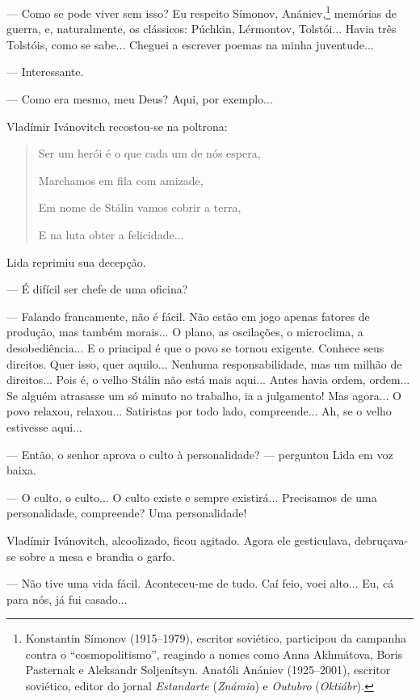 --- Como se pode viver sem isso? Eu respeito Símonov, Anániev,\footnote{Konstantin
  Símonov (1915--1979), escritor soviético, participou da campanha
  contra o ``cosmopolitismo'', reagindo a nomes como Anna Akhmátova,
  Boris Pasternak e Aleksandr Soljenítsyn. Anatóli Anániev (1925--2001),
  escritor soviético, editor do jornal \emph{Estandarte} (\emph{Známia})
  e \emph{Outubro} (\emph{Oktiábr})\emph{.}} memórias de guerra, e,
naturalmente, os clássicos: Púchkin, Lérmontov, Tolstói... Havia três
Tolstóis, como se sabe... Cheguei a escrever poemas na minha
juventude...

--- Interessante.

--- Como era mesmo, meu Deus? Aqui, por exemplo...

Vladímir Ivánovitch recostou-se na poltrona:

\begin{quote}
Ser um herói é o que cada um de nós espera,

Marchamos em fila com amizade,

Em nome de Stálin vamos cobrir a terra,

E na luta obter a felicidade...
\end{quote}

Lida reprimiu sua decepção.

--- É difícil ser chefe de uma oficina?

--- Falando francamente, não é fácil. Não estão em jogo apenas fatores
de produção, mas também morais... O plano, as oscilações, o microclima,
a desobediência... E o principal é que o povo se tornou exigente.
Conhece seus direitos. Quer isso, quer aquilo... Nenhuma
responsabilidade, mas um milhão de direitos... Pois é, o velho Stálin
não está mais aqui... Antes havia ordem, ordem... Se alguém atrasasse um
só minuto no trabalho, ia a julgamento! Mas agora... O povo relaxou,
relaxou... Satiristas por todo lado, compreende... Ah, se o velho
estivesse aqui...

--- Então, o senhor aprova o culto à personalidade? --- perguntou Lida
em voz baixa.

--- O culto, o culto... O culto existe e sempre existirá... Precisamos
de uma personalidade, compreende? Uma personalidade!

Vladímir Ivánovitch, alcoolizado, ficou agitado. Agora ele gesticulava,
debruçava-se sobre a mesa e brandia o garfo.

--- Não tive uma vida fácil. Aconteceu-me de tudo. Caí feio, voei
alto... Eu, cá para nós, já fui casado...

